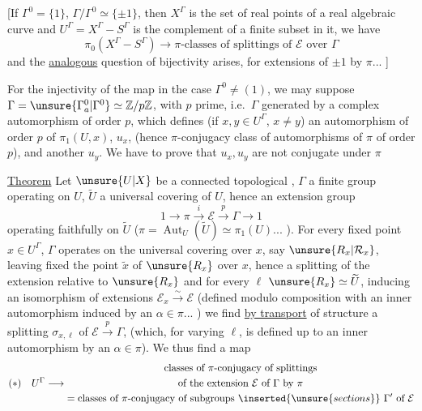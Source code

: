 [If $\Gamma^0=\{1\}$, $\Gamma/\Gamma^0\simeq\{\pm1\}$, then $X^\Gamma$ is the set of real points of a real algebraic curve and $U^\Gamma=X^\Gamma-S^\Gamma$ is the complement of a finite subset in it, we have
\[
\pi_0(X^\Gamma-S^\Gamma)\longrightarrow
\pi\text{-classes of splittings of }\mathcal E\text{ over }\Gamma
\]
and the  \uline{analogous} question of bijectivity arises, for extensions of $\pm1$ by $\pi$... ]

For the injectivity of the map in the case $\Gamma^0\ne(1)$, we may suppose $\Gamma=\unsure{\Gamma^0_a|\Gamma^0}\simeq\mathbb Z/p\mathbb Z$, with $p$ prime, i.e.\ $\Gamma$ generated by a complex automorphism  of order $p$, which defines (if $x,y\in U^\Gamma$, $x\ne y$) an automorphism of order $p$ of $\pi_1(U,x)$,  $u_x$,   (hence $\pi$-conjugacy class of automorphisms of $\pi$ of order $p$), and another $u_y$.
We have to prove that $u_x,u_y$ are not conjugate under $\pi$


\uline{Theorem} Let $\unsure{U|X}$ be  a connected topological  , $\Gamma$ a finite group operating  on $U$, $\widetilde U$ a universal covering of $U$, hence  an extension group
\[
1\longrightarrow\pi\xrightarrow{i}\mathcal E\xrightarrow{p}\Gamma\longrightarrow1
\]
operating faithfully on $\widetilde U$ ($\pi=\operatorname{Aut}_U(\widetilde U)\simeq\pi_1(U)$... ).
For every fixed point $x\in U^\Gamma$, $\Gamma$ operates on the universal covering  over $x$, say  $\unsure{R_x|\mathcal R_x}$, leaving fixed the point  $\widetilde x$ of $\unsure{R_x}$ over $x$, hence a splitting of the extension relative to $\unsure{R_x}$
and for every   $\ell$  $\unsure{R_x}\simeq\widetilde U$, inducing an isomorphism of extensions $\mathcal E_x\xrightarrow{\sim}\mathcal E$ (defined  modulo composition with an inner automorphism induced by an $\alpha\in\pi$... ) we find \uline{by transport} of structure a splitting $\sigma_{x,\ell}$ of $\mathcal E\xrightarrow{p}\Gamma$, (which, for varying $\ell$, is defined up to an inner automorphism by an $\alpha\in\pi$).
We thus find a map
\[
(*)\quad U^\Gamma\longrightarrow
\begin{gathered}
\text{classes of }\pi\text{-conjugacy of splittings}\\
\text{of the extension }\mathcal E\text{ of }\Gamma\text{ by }\pi\\
=\text{classes of }\pi\text{-conjugacy of subgroups }\inserted{\unsure{sections}}\ \Gamma'\text{ of }\mathcal E
\end{gathered}
\]